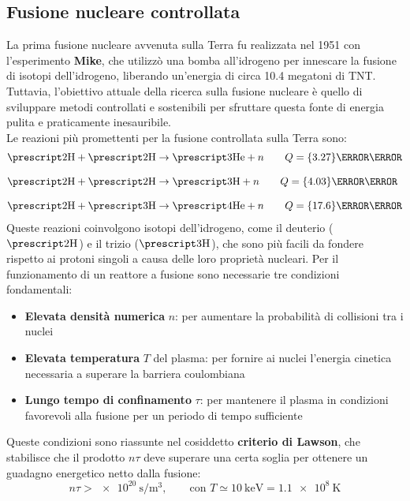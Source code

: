 \subsection{Fusione nucleare controllata}
La prima fusione nucleare avvenuta sulla Terra fu realizzata nel 1951 con l'esperimento \textbf{Mike}, che utilizzò una bomba all'idrogeno per innescare la fusione di isotopi dell'idrogeno, liberando un'energia di circa 10.4 megatoni di TNT. Tuttavia, l'obiettivo attuale della ricerca sulla fusione nucleare è quello di sviluppare metodi controllati e sostenibili per sfruttare questa fonte di energia pulita e praticamente inesauribile.\\
Le reazioni più promettenti per la fusione controllata sulla Terra sono:
\begin{equation}
    \begin{split}
        &\atom{H}{2}{} + \atom{H}{2}{} \rightarrow \atom{He}{3}{} + n \qquad Q = \qty{3.27}{\mega\electronvolt} \\[8pt]
        &\atom{H}{2}{} + \atom{H}{2}{} \rightarrow \atom{H}{3}{} + n \qquad Q = \qty{4.03}{\mega\electronvolt} \\[8pt]
        &\atom{H}{2}{} + \atom{H}{3}{} \rightarrow \atom{He}{4}{} + n \qquad Q = \qty{17.6}{\mega\electronvolt}
    \end{split}
\end{equation}
Queste reazioni coinvolgono isotopi dell'idrogeno, come il deuterio ($\atom{H}{2}{}$) e il trizio ($\atom{H}{3}{}$), che sono più facili da fondere rispetto ai protoni singoli a causa delle loro proprietà nucleari. Per il funzionamento di un reattore a fusione sono necessarie tre condizioni fondamentali:
\begin{itemize}
    \item \textbf{Elevata densità numerica} $n$: per aumentare la probabilità di collisioni tra i nuclei
    \item \textbf{Elevata temperatura} $T$ del plasma: per fornire ai nuclei l'energia cinetica necessaria a superare la barriera coulombiana
    \item \textbf{Lungo tempo di confinamento} $\tau$: per mantenere il plasma in condizioni favorevoli alla fusione per un periodo di tempo sufficiente
\end{itemize}
Queste condizioni sono riassunte nel cosiddetto \textbf{criterio di Lawson}, che stabilisce che il prodotto $n \tau$ deve superare una certa soglia per ottenere un guadagno energetico netto dalla fusione:
\begin{equation}
    n \tau > \qty{e20}{\second\per\meter\cubed}, \qquad \text{con } T \simeq \qty{10}{\kilo\electronvolt} = \qty{1.1e8}{\kelvin}
\end{equation}
